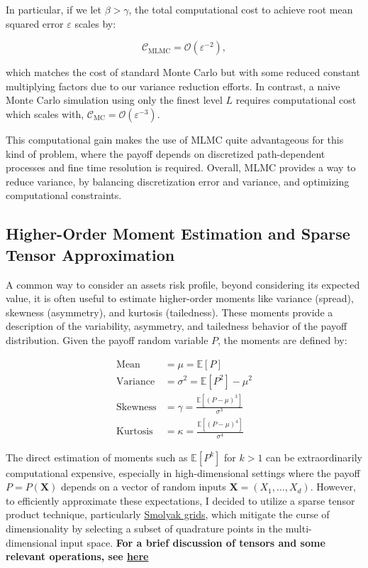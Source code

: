 \documentclass[titlepage]{article}
\begin{document}
In particular, if we let \(\beta > \gamma\), the total computational cost to achieve root mean squared error \(\varepsilon\) scales by:

\[
\mathcal{C}_{\text{MLMC}} = \mathcal{O}(\varepsilon^{-2}),
\]

which matches the cost of standard Monte Carlo but with some reduced constant multiplying factors due to our variance reduction efforts. In contrast, a naive Monte Carlo simulation using only the finest level \(L\) requires computational cost which scales with, \(\mathcal{C}_{\text{MC}} = \mathcal{O}(\varepsilon^{-3})\).

This computational gain makes the use of MLMC quite advantageous for this kind of problem, where the payoff depends on discretized path-dependent processes and fine time resolution is required. Overall, MLMC provides a way to reduce variance, by balancing discretization error and variance, and optimizing computational constraints.

\subsection{Higher-Order Moment Estimation and Sparse Tensor Approximation}

A common way to consider an assets risk profile, beyond considering its expected value, it is often useful to estimate higher-order moments like variance (spread), skewness (asymmetry), and kurtosis (tailedness). These moments provide a description of the variability, asymmetry, and tailedness behavior of the payoff distribution. Given the payoff random variable \(P\), the moments are defined by:

\begin{align}
\text{Mean} &= \mu = \mathbb{E}[P] \label{eq:mean} \\
\text{Variance} &= \sigma^2 = \mathbb{E}[P^2] - \mu^2 \label{eq:variance} \\
\text{Skewness} &= \gamma = \frac{\mathbb{E}[(P - \mu)^3]}{\sigma^3} \label{eq:skewness} \\
\text{Kurtosis} &= \kappa = \frac{\mathbb{E}[(P - \mu)^4]}{\sigma^4} \label{eq:kurtosis}
\end{align}

The direct estimation of moments such as \(\mathbb{E}[P^k]\) for \(k > 1\) can be extraordinarily computational expensive, especially in high-dimensional settings where the payoff \(P = P(\mathbf{X})\) depends on a vector of random inputs \(\mathbf{X} = (X_1, \dots, X_d)\). However, to efficiently approximate these expectations, I decided to utilize a sparse tensor product technique, particularly \href{sec:Smolyak}{Smolyak grids}, which mitigate the curse of dimensionality by selecting a subset of quadrature points in the multi-dimensional input space. \textbf{For a brief discussion of tensors and some relevant operations, see \href{sec:sparse tensor}{here}}
\end{document}
